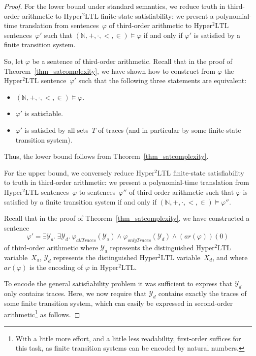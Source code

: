 \documentclass[dvipsnames,10pt,a4paper]{amsart}
\theoremstyle{definition}
\theoremstyle{remark}
\newcommand{\nats}{\mathbb{N}}
\renewcommand{\phi}{\varphi}
\newcommand{\sohyltl}{\mathrm{Hyper^2LTL}\xspace}
\newcommand{\univar}{X_a}
\newcommand{\unidisvar}{X_d}
\newcommand{\arithmetize}{{\mathit{ar}}}
\newcommand{\onlytraces}{\mathit{onlyTraces}}
\newcommand{\alltraces}{\mathit{allTraces}}
\newcommand{\calY}{\mathcal{Y}}
\newcommand{\natsstruct}{(\nats, +, \cdot, <, \in)}
\begin{document}
\begin{proof}
For the lower bound under standard semantics, we reduce truth in third-order arithmetic to $\sohyltl$ finite-state satisfiability: we present a polynomial-time translation from sentences~$\phi$ of third-order arithmetic to $\sohyltl$ sentences~$\phi'$ such that $\natsstruct \models \phi$ if and only if $\phi'$ is satisfied by a finite transition system.

So, let $\phi$ be a sentence of third-order arithmetic. Recall that in the proof of Theorem~\ref{thm_satcomplexity}, we have shown how to construct from $\phi$ the $\sohyltl$ sentence~$\phi'$ such that the following three statements are equivalent:
\begin{itemize}
    \item $\natsstruct \models \phi$.
    \item $\phi'$ is satisfiable.
    \item $\phi'$ is satisfied by all sets~$T$ of traces (and in particular by some finite-state transition system).
\end{itemize}
Thus, the lower bound follows from Theorem~\ref{thm_satcomplexity}.

For the upper bound, we conversely reduce $\sohyltl$ finite-state satisfiability to truth in third-order arithmetic: we present a polynomial-time translation from $\sohyltl$ sentences~$\phi$ to sentences~$\phi''$ of third-order arithmetic such that  $\phi$ is satisfied by a finite transition system if and only if  $\natsstruct \models \phi''$.

Recall that in the proof of Theorem~\ref{thm_satcomplexity}, we have constructed a sentence
\[\phi' = \exists \calY_a.\ \exists\calY_d.\ \phi_\alltraces(\calY_a) \wedge \phi_\onlytraces(\calY_d)\wedge (\arithmetize(\phi))(0)\]
of third-order arithmetic where $\calY_a$ represents the distinguished $\sohyltl$ variable~$\univar$, $\calY_d$ represents the distinguished $\sohyltl$ variable~$\unidisvar$, and where $\arithmetize(\phi)$ is the encoding of $\phi$ in $\sohyltl$.

To encode the general satisfiability problem it was sufficient to express that $\calY_d$ only contains traces.
Here, we now require that $\calY_d$ contains exactly the traces of some finite transition system, which can easily be expressed in second-order arithmetic\footnote{With a little more effort, and a little less readability, first-order suffices for this task, as finite transition systems can be encoded by natural numbers.} as follows.


\end{proof}
\end{document}
